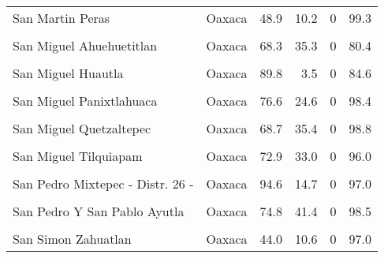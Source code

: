 \documentclass[
]{report}
\begin{document}
\begin{longtable}[t]{llrrrr}
San Martin Peras & Oaxaca & 48.9 & 10.2 & 0 & 99.3\\
\addlinespace
\cellcolor{gray!6}{San Mateo Nejapam} & \cellcolor{gray!6}{Oaxaca} & \cellcolor{gray!6}{86.7} & \cellcolor{gray!6}{13.2} & \cellcolor{gray!6}{0} & \cellcolor{gray!6}{68.3}\\
San Miguel Ahuehuetitlan & Oaxaca & 68.3 & 35.3 & 0 & 80.4\\
\cellcolor{gray!6}{San Miguel Chicahua} & \cellcolor{gray!6}{Oaxaca} & \cellcolor{gray!6}{91.7} & \cellcolor{gray!6}{21.7} & \cellcolor{gray!6}{0} & \cellcolor{gray!6}{93.2}\\
San Miguel Huautla & Oaxaca & 89.8 & 3.5 & 0 & 84.6\\
\cellcolor{gray!6}{San Miguel Mixtepec} & \cellcolor{gray!6}{Oaxaca} & \cellcolor{gray!6}{77.8} & \cellcolor{gray!6}{23.0} & \cellcolor{gray!6}{0} & \cellcolor{gray!6}{97.0}\\
\addlinespace
San Miguel Panixtlahuaca & Oaxaca & 76.6 & 24.6 & 0 & 98.4\\
\cellcolor{gray!6}{San Miguel Piedras} & \cellcolor{gray!6}{Oaxaca} & \cellcolor{gray!6}{96.9} & \cellcolor{gray!6}{23.5} & \cellcolor{gray!6}{0} & \cellcolor{gray!6}{84.7}\\
San Miguel Quetzaltepec & Oaxaca & 68.7 & 35.4 & 0 & 98.8\\
\cellcolor{gray!6}{San Miguel Santa Flor} & \cellcolor{gray!6}{Oaxaca} & \cellcolor{gray!6}{74.5} & \cellcolor{gray!6}{32.1} & \cellcolor{gray!6}{0} & \cellcolor{gray!6}{93.4}\\
San Miguel Tilquiapam & Oaxaca & 72.9 & 33.0 & 0 & 96.0\\
\addlinespace
\cellcolor{gray!6}{San Pablo Tijaltepec} & \cellcolor{gray!6}{Oaxaca} & \cellcolor{gray!6}{80.9} & \cellcolor{gray!6}{20.2} & \cellcolor{gray!6}{0} & \cellcolor{gray!6}{97.5}\\
San Pedro Mixtepec - Distr. 26 - & Oaxaca & 94.6 & 14.7 & 0 & 97.0\\
\cellcolor{gray!6}{San Pedro Ocopetatillo} & \cellcolor{gray!6}{Oaxaca} & \cellcolor{gray!6}{74.2} & \cellcolor{gray!6}{40.7} & \cellcolor{gray!6}{0} & \cellcolor{gray!6}{98.4}\\
San Pedro Y San Pablo Ayutla & Oaxaca & 74.8 & 41.4 & 0 & 98.5\\
\cellcolor{gray!6}{San Sebastian Nicananduta} & \cellcolor{gray!6}{Oaxaca} & \cellcolor{gray!6}{93.8} & \cellcolor{gray!6}{18.1} & \cellcolor{gray!6}{0} & \cellcolor{gray!6}{97.6}\\
\addlinespace
San Simon Zahuatlan & Oaxaca & 44.0 & 10.6 & 0 & 97.0\\

\end{longtable}
\end{document}
